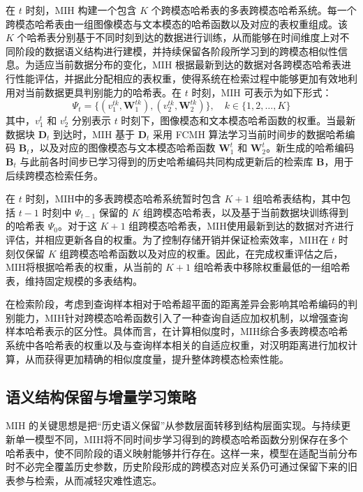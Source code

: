 在 $t$ 时刻，MIH 构建一个包含 $K$ 个跨模态哈希表的多表跨模态哈希系统。每一个跨模态哈希表由一组图像模态与文本模态的哈希函数以及对应的表权重组成。该 $K$ 个哈希表分别基于不同时刻到达的数据进行训练，从而能够在时间维度上对不同阶段的数据语义结构进行建模，并持续保留各阶段所学习到的跨模态相似性信息。为适应当前数据分布的变化，MIH 根据最新到达的数据对各跨模态哈希表进行性能评估，并据此分配相应的表权重，使得系统在检索过程中能够更加有效地利用对当前数据更具判别能力的哈希表。在 $t$ 时刻，MIH 可表示为如下形式：
\begin{equation}
  \Psi_t = \{(v_1^{tk}, \mathbf{W}_1^{tk}), (v_2^{tk}, \mathbf{W}_2^{tk})\}, \quad k \in \{1,2,\dots,K\}
\end{equation}
其中，$v_1^t$ 和 $v_2^t$ 分别表示 $t$ 时刻下，图像模态和文本模态哈希函数的权重。当最新数据块 $\mathbf{D}_t$ 到达时，MIH 基于 $\mathbf{D}_t$ 采用 FCMH 算法学习当前时间步的数据哈希编码 $\mathbf{B}_t$，以及对应的图像模态与文本模态哈希函数 $\mathbf{W}_1^t$ 和 $\mathbf{W}_2^t$。新生成的哈希编码 $\mathbf{B}_t$ 与此前各时间步已学习得到的历史哈希编码共同构成更新后的检索库 $\mathbf{B}$，用于后续跨模态检索任务。

在 $t$ 时刻，MIH中的多表跨模态哈希系统暂时包含 $K+1$ 组哈希表结构，其中包括 $t-1$ 时刻中 $\Psi_{t-1}$ 保留的 $K$ 组跨模态哈希表，以及基于当前数据块训练得到的哈希表 $\Psi_0$。对于这 $K+1$ 组跨模态哈希表，MIH使用最新到达的数据对齐进行评估，并相应更新各自的权重。为了控制存储开销并保证检索效率，MIH在 $t$ 时刻仅保留 $K$ 组跨模态哈希函数以及对应的权重。因此，在完成权重评估之后，MIH将根据哈希表的权重，从当前的 $K+1$ 组哈希表中移除权重最低的一组哈希表，维持固定规模的多表结构。

在检索阶段，考虑到查询样本相对于哈希超平面的距离差异会影响其哈希编码的判别能力，MIH针对跨模态哈希函数引入了一种查询自适应加权机制，以增强查询样本哈希表示的区分性。具体而言，在计算相似度时，MIH综合多表跨模态哈希系统中各哈希表的权重以及与查询样本相关的自适应权重，对汉明距离进行加权计算，从而获得更加精确的相似度度量，提升整体跨模态检索性能。

\subsection{语义结构保留与增量学习策略}

MIH 的关键思想是把“历史语义保留”从参数层面转移到结构层面实现。与持续更新单一模型不同，MIH将不同时间步学习得到的跨模态哈希函数分别保存在多个哈希表中，使不同阶段的语义映射能够并行存在。这样一来，模型在适配当前分布时不必完全覆盖历史参数，历史阶段形成的跨模态对应关系仍可通过保留下来的旧表参与检索，从而减轻灾难性遗忘。

